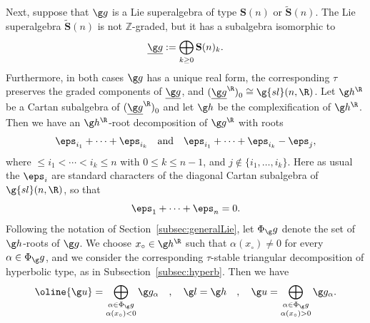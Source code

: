 \documentclass[12pt]{amsart}
\begin{document}
Next, suppose that  $\g g$ is a Lie superalgebra of type 
$\mathbf{S}(n)$ or 
$\tilde{\mathbf S}(n)$. The Lie superalgebra $\tilde{\mathbf S}(n)$ is not $\mathbb Z$-graded, but it has a subalgebra  isomorphic to 
\[
\underline{\g g}:=\bigoplus_{k\geq 0}\mathbf S(n)_k.
\] Furthermore, in both cases $\g g$ has a unique real form, the corresponding $\tau$ preserves the graded components of $\underline{\g g}$, and 
$(\underline{\g g}^\R)_{0}^{}\cong \g{sl}(n,\R)$. Let $\g h^\R$ be a  Cartan subalgebra of $(\underline{\g g}^\R)_{0}^{}$ and let $\g h$ be the complexification of $\g h^\R$. Then we have an $\g h^\R$-root decomposition of $\g g^\R$ with roots
\[
\eps_{i_1}+\cdots +\eps_{i_k}\quad\text{and}\quad
\eps_{i_1}+\cdots +\eps_{i_k}-\eps_j,
\]
where $\leq i_1<\cdots<i_k\leq n$ with $0\leq k\leq n-1$,  and $j\not\in\{i_1,\ldots,i_k\}$. 
Here as usual the $\eps_i$ are standard characters of the diagonal Cartan subalgebra of $\g{sl}(n,\R)$, so that \[
\eps_1+\cdots+\eps_n=0.
\] Following the notation of Section~\ref{subsec:generalLie}, let $\Phi_\g g$ denote the set of $\g h$-roots of $\g g$. 
We choose $x_\circ\in \g h^\R$ such that $\alpha(x_\circ)\neq 0$ for every $\alpha\in \Phi_\g g$, and we consider the 
corresponding $\tau$-stable triangular decomposition of hyperbolic type, as in Subsection~\ref{subsec:hyperb}. Then we  have 
\[
\oline{\g u}=\bigoplus_{\begin{subarray}{c}
\alpha\in\Phi_\g g\\
\alpha(x_\circ)<0\end{subarray}}
\g g_\alpha\quad,\quad
{\g l}=\g h
\quad,\quad
{\g u}=\bigoplus_{\begin{subarray}{c}
\alpha\in\Phi_\g g\\
\alpha(x_\circ)>0\end{subarray}}
\g g_\alpha
.\]
\end{document}
